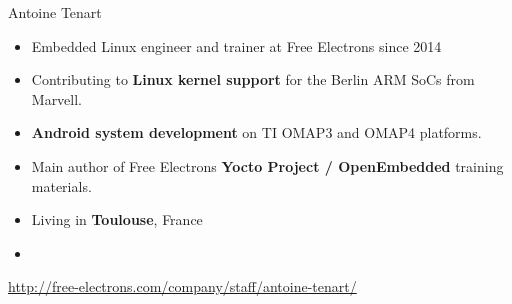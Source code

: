 \begin{frame}{Antoine Tenart}
    \begin{itemize}
	\item Embedded Linux engineer and trainer at Free Electrons since 2014
  	\item Contributing to {\bf Linux kernel support} for the Berlin ARM
	      SoCs from Marvell.
	\item {\bf Android system development} on TI OMAP3 and OMAP4 platforms.
	\item Main author of Free Electrons {\bf Yocto Project / OpenEmbedded}
	      training materials.
  	\item Living in {\bf Toulouse}, France
    	\item {}
    \end{itemize}
    {\small \url{http://free-electrons.com/company/staff/antoine-tenart/}}
\end{frame}
